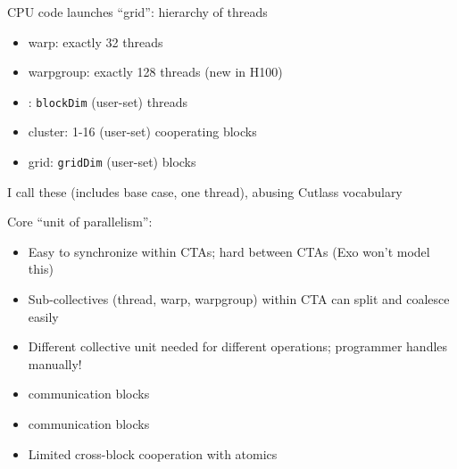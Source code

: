 \begin{minipage}[t]{0.5\textwidth}\fixminipage

CPU code launches ``grid'': hierarchy of threads
\begin{itemize}
  \item warp: exactly 32 threads
  \item warpgroup: exactly 128 threads (new in H100)
  \item {}: \texttt{blockDim} (user-set) threads
  \item cluster: 1-16 (user-set) cooperating blocks
  \item grid: \texttt{gridDim} (user-set) blocks
\end{itemize}
I call these  (includes base case, one thread), abusing Cutlass vocabulary

Core ``unit of parallelism'': 
\begin{itemize}
  \item Easy to synchronize within CTAs; hard between CTAs (Exo won't model this)
  \item Sub-collectives (thread, warp, warpgroup) within CTA can split and coalesce easily
  \item Different collective unit needed for different operations; programmer handles manually!
  \item {} communication  blocks
  \item {} communication  blocks
  \item Limited cross-block cooperation with atomics
\end{itemize}
\end{minipage}
\hfill
